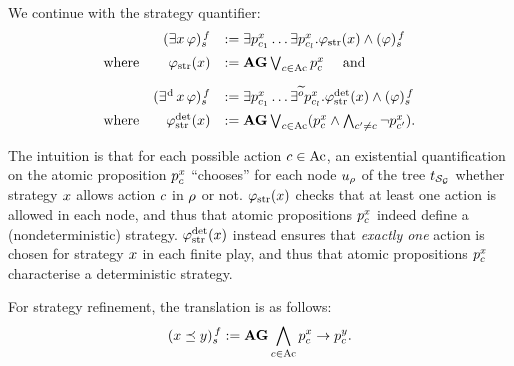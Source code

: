 We continue with the strategy quantifier:
\[
  \begin{array}{lrl}
& \tr[f]{\exists\var\,\phi}	& \egdef  \exists
                                  p_{\mov_{1}}^{\var}\ldots
                                  \exists
                                  p_{\mov_{\maxmov}}^{\var}. \phistrat
                                  \et \tr[f]{\phi}\\[5pt]
  \mbox{where} &  \phistrat & \egdef \A\always
                              \bigou_{\mov\in\Mov}p_{\mov}^{\var}
                              \quad\mbox{ and}\\[10pt]
& \tr[f]{\existsd\var\,\phi}	& \egdef  \exists
                                  p_{\mov_{1}}^{\var}\ldots
                                  \exists^{\trobs{\obs}}
                                  p_{\mov_{\maxmov}}^{\var}. \phistratdet
                                  \et \tr[f]{\phi}\\[5pt]
  \mbox{where} & \phistratdet & \egdef
\A\always\bigou_{\mov\in\Mov}(p_{\mov}^{\var}\et\biget_{\mov'\neq\mov}\neg
p_{\mov'}^{\var}).                              
\end{array}
\]

The intuition is that for each possible action $\mov\in\Mov$, an
existential quantification on the atomic proposition $p_{\mov}^{\var}$
``chooses'' for each  node $\noeud_{\fplay}$ of the tree 
$\unfold[\KS_{\CGS}]{\sstate_{{\pos_0}}}$ whether strategy $\var$
allows action $\mov$ in $\fplay$ or not. 
$\phistrat$  checks that at least one action is allowed in each
node, and thus that atomic propositions
$p_{\mov}^{\var}$ indeed define a (nondeterministic) strategy.
$\phistratdet$ instead ensures that \emph{exactly one} action is chosen for strategy $\var$  in each finite
play, and thus that atomic propositions
$p_{\mov}^{\var}$  characterise a
deterministic strategy.

For strategy refinement, the translation is as follows:
\[\tr[f]{\var \refines \varb} \egdef \A\always\biget_{\mov\in\Mov} p_\mov^\var
  \impl p_\mov^{\varb}.\]

